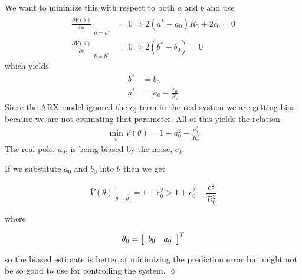 \begin{example}
We want to minimize this with respect to both $a$ and $b$ and use
\begin{align*}
\left.\frac{\partial\bar{V}(\theta)}{\partial a}\right|_{a=a^\ast} &= 0 \Rightarrow 2(a^\ast-a_0)R_0+2c_0=0 \\
\left.\frac{\partial\bar{V}(\theta)}{\partial b}\right|_{b=b^\ast} &= 0 \Rightarrow 2(b^\ast-b_0)=0
\end{align*}
which yields
\begin{align*}
b^\ast &= b_0 \\
a^\ast &= a_0-\frac{c_0}{R_0}
\end{align*}
Since the ARX model ignored the $c_0$ term in the real system we are getting bias because we are not estimating that parameter.
All of this yields the relation
\begin{align*}
\boxed{\min_\theta\bar{V}(\theta) = 1+a_0^2-\frac{c_0^2}{R_0^2}}
\end{align*}
The real pole, $a_0$, is being biased by the noise, $c_0$.

If we substitute $a_0$ and $b_0$ into $\theta$ then we get

\begin{equation*}
\left.\bar{V}(\theta)\right|_{\theta=\theta_0} = 1+c_0^2 > 1+c_0^2-\frac{c_0^2}{R_0^2}
\end{equation*}

where

\begin{equation*}
\theta_0 = \left[\begin{array}{c c} b_0 & a_0 \end{array}\right]^T
\end{equation*}

so the biased estimate is better at minimizing the prediction error but might not be so good to use for controlling the system.
$\lozenge$
\end{example}%
